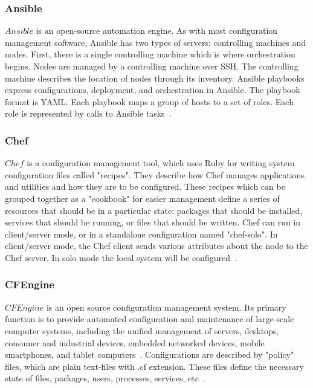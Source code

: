 \subsubsection*{Ansible} \label{lang:ansible}
$Ansible$ is an open-source automation engine. %
As with most configuration management software, Ansible has two types of servers: controlling machines and nodes.
First, there is a single controlling machine which is where orchestration begins.
Nodes are managed by a controlling machine over SSH.
The controlling machine describes the location of nodes through its inventory.
Ansible playbooks express configurations, deployment, and orchestration in Ansible.
The playbook format is YAML. 
Each playbook maps a group of hosts to a set of roles.
Each role is represented by calls to Ansible tasks~\cite{ansible}.
\subsubsection*{Chef} \label{lang:shef}
$Chef$ is a configuration management tool, which uses Ruby for writing system configuration files called "recipes".
They describe how Chef manages applications and utilities and how they are to be configured.
These recipes which can be grouped together as a "cookbook" for easier management define a series of resources that should be in a particular state: packages that should be installed, services that should be running, or files that should be written.
Chef can run in client/server mode, or in a standalone configuration named "chef-solo".
In client/server mode, the Chef client sends various attributes about the node to the Chef server. 
In solo mode the local system will be configured~\cite{chef}.
\subsubsection*{CFEngine}
$CFEngine$ is an open source configuration management system.
Its primary function is to provide automated configuration and maintenance of large-scale computer systems, including the unified management of servers, desktops, consumer and industrial devices, embedded networked devices, mobile smartphones, and tablet computers~\cite{cfengine}.
Configurations are described by "policy" files, which are plain text-files with .cf extension.
These files define the necessary state of files, packages, users, processes, services, etc~\cite{cfengine2}.
